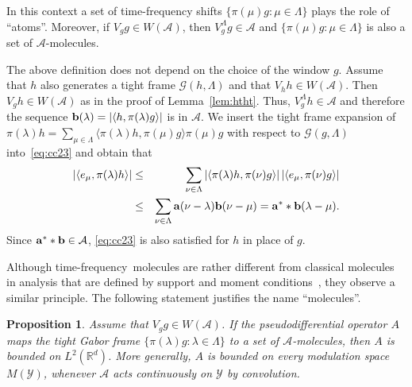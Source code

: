 \documentclass[12pt]{amsart}
\newtheorem{proposition}{Proposition}[section]
\theoremstyle{definition}
\theoremstyle{remark}
\numberwithin{equation}{section}
\newcommand{\stft}{short-time Fourier transform}
\newcommand{\tf}{time-frequency}
\newcommand{\tfs}{time-frequency shift}
\newcommand{\modsp}{modulation space}
\def\cG{\mathcal{G}}
\def\cA{\mathcal{A}}
\def\cY{\mathcal{Y}}
\def\bR{{\mathbb{R}}}
\def\rd{\bR^d}
\def\lrd{L^2(\rd)}
\def\inv{^{-1}}
\def\cG{\mathcal{G}}
\def\cA{\mathcal{A}}
\newcommand{\bba}{{\bf a}}
\newcommand{\bbb}{{\bf b}}
\newcommand{\bbd}{{\bf d}}
\newcommand{\Cal}{\mathcal}
\newcommand{\la}{\lambda}
\newcommand{\La}{\Lambda}
\newcommand{\lan}{\langle}
\newcommand{\ran}{\rangle}
\newcommand{\ac}{\Cal A}
\begin{document}
In this context a set of \tfs s 
$\{\pi(\mu)g:\mu\in\La\}$ plays the role of ``atoms''.  Moreover, if
$V_gg\in W(\ac)$, then 
$V^\La_gg\in \ac$ and  $\{\pi(\mu)g:\mu\in\La\}$ is also a set of $\cA
$-molecules. 

The above definition does not depend on the choice of the window
$g$. Assume that $h$ also generates a tight frame $\cG (h,\Lambda )$ and
that $V_hh \in W(\cA )$.%
Then %
$V_gh\in
W(\ac)$ as in the proof of Lemma~\ref{lem:htht}.  Thus, $V^\La_gh\in\ac$ and therefore the sequence $\bbb
(\lambda ) = |\lan h,\pi(\la)g\ran|$ is in $\cA $. 
We insert the tight frame expansion of $\pi (\lambda )h= \sum
_{\mu \in \Lambda } \langle \pi (\lambda ) h, \pi (\mu )g\rangle \pi
(\mu )g$ with respect
to $\cG (g,\Lambda )$ into~\eqref{eq:cc23}    
and obtain  that 
\begin{eqnarray*}
|\lan e_\mu,\pi(\la)h\ran|&\leq & \sum_{\nu\in\La}|\lan
\pi (\lambda )h,\pi(\nu)g\ran|\,|\lan e_\mu,\pi(\nu)g\ran| \\
&\le &
\sum_{\nu\in\La} \bba(\nu-\la)\bbb(\nu-\mu)=\bba^*\ast \bbb
(\la-\mu).  
\end{eqnarray*}
Since $\bba^*\ast \bbb\in \cA $, \eqref{eq:cc23} is also satisfied for
$h$ in place of $g$. 


 Although \tf\ molecules are rather different from
classical molecules in analysis that are defined by support and
moment conditions~\cite{stein-weiss,stein93}, they observe a similar principle. The
following statement  justifies the name ``molecules''.


\begin{proposition}\label{molbound}
Assume that $V_gg\in W(\cA )$.    If the pseudodifferential operator
$A$ maps the tight Gabor frame 
$\{\pi
(\lambda )g : \lambda \in \Lambda \}$ to a set of $\cA
$-molecules,
then $A $ is bounded on $\lrd $. More generally, $A$ is bounded on
every \modsp\ $M(\cY)$, whenever  $\cA $ acts continuously on $\cY $
by convolution. 
\end{proposition}
\end{document}
